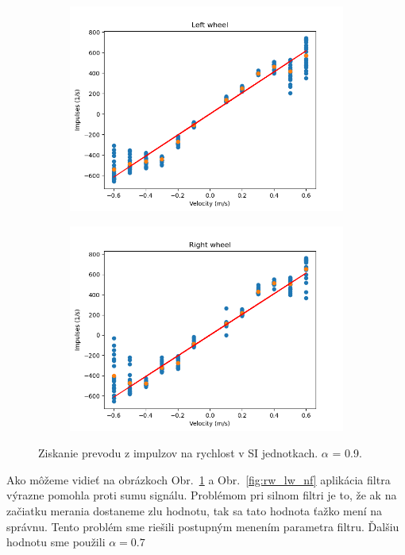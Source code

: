 \begin{figure}[!htbp]
	\begin{subfigure}{0.5\textwidth}
		\includegraphics[width=\textwidth]{img/lw_09250.png}
	\end{subfigure}
	\hfill
	\begin{subfigure}{0.5\textwidth}
		\includegraphics[width=\textwidth]{img/rw_09250.png}
	\end{subfigure}
	\caption{Ziskanie prevodu z impulzov na rychlost v SI jednotkach. \(\alpha\) = 0.9.}
	\label{fig:rw_lw_09250}
\end{figure}

Ako môžeme vidieť na obrázkoch Obr.~\ref{fig:rw_lw_09250} a Obr.~\ref{fig:rw_lw_nf} aplikácia filtra výrazne pomohla proti sumu signálu.
Problémom pri silnom filtri je to, že ak na začiatku merania dostaneme zlu hodnotu, tak sa tato hodnota ťažko mení na správnu.
Tento problém sme riešili postupným menením parametra filtru. Ďalšiu hodnotu sme použili \(\alpha = 0.7\)

